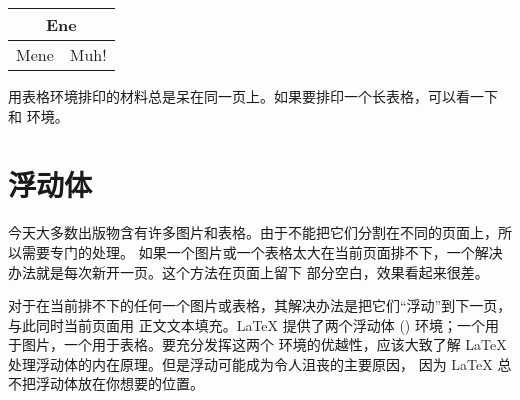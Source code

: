 \begin{example}
\begin{tabular}{|c|c|}
\hline
\multicolumn{2}{|c|}{Ene} \\
\hline
Mene & Muh! \\
\hline
\end{tabular}
\end{example}

用表格环境排印的材料总是呆在同一页上。如果要排印一个长表格，可以看一下
  和  环境。

\section{浮动体}
今天大多数出版物含有许多图片和表格。由于不能把它们分割在不同的页面上，所以需要专门的处理。
如果一个图片或一个表格太大在当前页面排不下，一个解决办法就是每次新开一页。这个方法在页面上留下
部分空白，效果看起来很差。

对于在当前排不下的任何一个图片或表格，其解决办法是把它们“浮动”到下一页，与此同时当前页面用
正文文本填充。\LaTeX{} 提供了两个浮动体 () 环境；一个用于图片，一个用于表格。要充分发挥这两个
环境的优越性，应该大致了解 \LaTeX{} 处理浮动体的内在原理。但是浮动可能成为令人沮丧的主要原因，
因为 \LaTeX{} 总不把浮动体放在你想要的位置。

